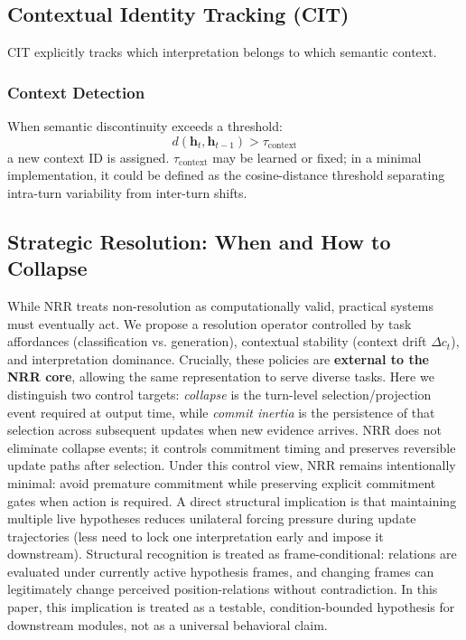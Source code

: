 \documentclass[11pt,a4paper]{article}
\begin{document}
\subsection{Contextual Identity Tracking (CIT)}

CIT explicitly tracks which interpretation belongs to which semantic context.

\subsubsection{Context Detection}
When semantic discontinuity exceeds a threshold:
\begin{equation}
d(\mathbf{h}_t, \mathbf{h}_{t-1}) > \tau_{\text{context}}
\end{equation}
a new context ID is assigned.
$\tau_{\text{context}}$ may be learned or fixed; in a minimal implementation, it could be defined as the cosine-distance threshold separating intra-turn variability from inter-turn shifts.

\subsection{Strategic Resolution: When and How to Collapse}

While NRR treats non-resolution as computationally valid, practical systems must eventually act.
We propose a resolution operator controlled by task affordances (classification vs. generation), contextual stability (context drift $\Delta c_t$), and interpretation dominance.
Crucially, these policies are \textbf{external to the NRR core}, allowing the same representation to serve diverse tasks.
Here we distinguish two control targets: \emph{collapse} is the turn-level selection/projection event required at output time, while \emph{commit inertia} is the persistence of that selection across subsequent updates when new evidence arrives. NRR does not eliminate collapse events; it controls commitment timing and preserves reversible update paths after selection.
Under this control view, NRR remains intentionally minimal: avoid premature commitment while preserving explicit commitment gates when action is required. A direct structural implication is that maintaining multiple live hypotheses reduces unilateral forcing pressure during update trajectories (less need to lock one interpretation early and impose it downstream). Structural recognition is treated as frame-conditional: relations are evaluated under currently active hypothesis frames, and changing frames can legitimately change perceived position-relations without contradiction. In this paper, this implication is treated as a testable, condition-bounded hypothesis for downstream modules, not as a universal behavioral claim.
\end{document}
